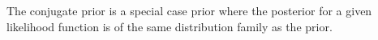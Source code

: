 The conjugate prior is a special case prior where the posterior for a given likelihood function is of the same distribution family as the prior. 